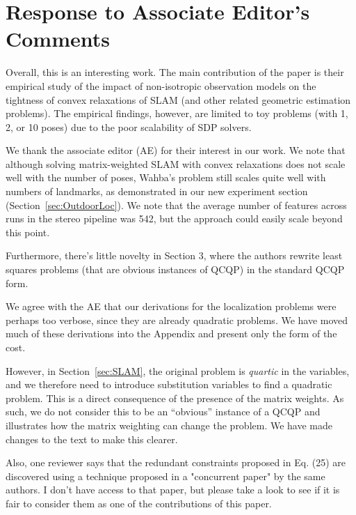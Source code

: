 \section*{Response to Associate Editor's Comments}

Overall, this is an interesting work. The main contribution of the  paper is their empirical study of the impact of non-isotropic  observation models on the tightness of convex relaxations of SLAM (and  other related geometric estimation problems). The empirical findings,  however, are limited to toy problems (with 1, 2, or 10 poses) due to the poor scalability of SDP solvers.
\begin{response}

We thank the associate editor (AE) for their interest in our work. We note that although solving matrix-weighted SLAM with convex relaxations does not scale well with the number of poses, Wahba's problem still scales quite well with numbers of landmarks, as demonstrated in our new experiment section (Section~\ref{sec:OutdoorLoc}). We note that the average number of features across runs in the stereo pipeline was 542, but the approach could easily scale beyond this point. 

\end{response}
Furthermore, there's little  novelty in Section 3, where the authors rewrite least squares problems  (that are obvious instances of QCQP) in the standard QCQP form.  
\begin{response}

We agree with the AE that our derivations for the localization problems were perhaps too verbose, since they are already quadratic problems. We have moved much of these derivations into the Appendix and present only the form of the cost.

However, in Section~\ref{sec:SLAM}, the original problem is \emph{quartic} in the variables, and we therefore need to introduce substitution variables to find a quadratic problem. This is a direct consequence of the presence of the matrix weights. As such, we do not consider this to be an ``obvious'' instance of a QCQP and illustrates how the matrix weighting can change the problem. We have made changes to the text to make this clearer.
\end{response}

Also, one reviewer says that the redundant constraints proposed in Eq. (25) are discovered using a technique proposed in a "concurrent paper"  by the same authors. I don't have access to that paper, but please take  a look to see if it is fair to consider them as one of the  contributions of this paper.  

